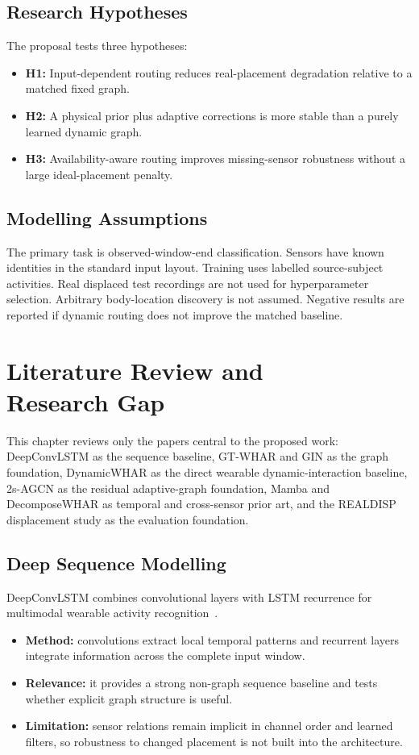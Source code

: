 \documentclass[12pt,a4paper,twoside,openright]{report}
\begin{document}
\section{Research Hypotheses}
The proposal tests three hypotheses:
\begin{itemize}
\item \textbf{H1:} Input-dependent routing reduces real-placement degradation relative to a matched fixed graph.
\item \textbf{H2:} A physical prior plus adaptive corrections is more stable than a purely learned dynamic graph.
\item \textbf{H3:} Availability-aware routing improves missing-sensor robustness without a large ideal-placement penalty.
\end{itemize}

\section{Modelling Assumptions}
The primary task is observed-window-end classification. Sensors have known identities in the standard input layout. Training uses labelled source-subject activities. Real displaced test recordings are not used for hyperparameter selection. Arbitrary body-location discovery is not assumed. Negative results are reported if dynamic routing does not improve the matched baseline.

\cleardoublepage
\chapter[Literature Review and Research Gap]{Literature Review and\\Research Gap}

This chapter reviews only the papers central to the proposed work: DeepConvLSTM as the sequence baseline, GT-WHAR and GIN as the graph foundation, DynamicWHAR as the direct wearable dynamic-interaction baseline, 2s-AGCN as the residual adaptive-graph foundation, Mamba and DecomposeWHAR as temporal and cross-sensor prior art, and the REALDISP displacement study as the evaluation foundation.

\section{Deep Sequence Modelling}
DeepConvLSTM combines convolutional layers with LSTM recurrence for multimodal wearable activity recognition~\cite{deepconvlstm}.
\begin{itemize}
\item \textbf{Method:} convolutions extract local temporal patterns and recurrent layers integrate information across the complete input window.
\item \textbf{Relevance:} it provides a strong non-graph sequence baseline and tests whether explicit graph structure is useful.
\item \textbf{Limitation:} sensor relations remain implicit in channel order and learned filters, so robustness to changed placement is not built into the architecture.
\end{itemize}
\end{document}
